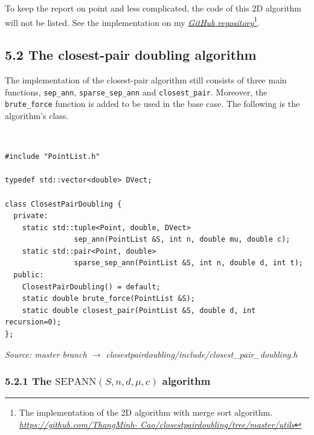 \documentclass[12pt,english,]{article}
\newcommand{\code}[1]{\colorbox{light-gray}{\texttt{#1}}}
\newcommand{\pnt}[1]{{\scriptstyle#1}}
\begin{document}
To keep the report on point and less complicated, the code of this 2D
algorithm will not be listed. See the implementation on my
\href{https://github.com/ThangMinhCao/closestpairdoubling/tree/master/utils}{\emph{GitHub
repository}}\footnote{The implementation of the 2D algorithm with merge
  sort algorithm.
  \href{https://github.com/ThangMinhCao/closestpairdoubling/tree/master/utils}{\emph{https://github.com/ThangMinh-}
  \emph{Cao/closestpairdoubling/tree/master/utils}}}.

\hypertarget{section5.2}{%
\subsection{5.2 The closest-pair doubling algorithm}\label{section5.2}}

The implementation of the closest-pair algorithm still consists of three
main functions, \code{sep\_ann}, \code{sparse\_sep\_ann} and
\code{closest\_pair}. Moreover, the \code{brute\_force} function is
added to be used in the base case. The following is the algorithm's
class.

~

\begin{lstlisting}
#include "PointList.h"

typedef std::vector<double> DVect;

class ClosestPairDoubling {
  private:
    static std::tuple<Point, double, DVect>
                sep_ann(PointList &S, int n, double mu, double c);
    static std::pair<Point, double>
                sparse_sep_ann(PointList &S, int n, double d, int t);
  public:
    ClosestPairDoubling() = default;
    static double brute_force(PointList &S);
    static double closest_pair(PointList &S, double d, int recursion=0);
};
\end{lstlisting}
\vspace{-9truemm}
\begin{minipage}{1\textwidth}
  \begin{flushright}
  {\footnotesize \emph{Source: master branch $\rightarrow$ closestpairdoubling/include/closest\_pair\_doubling.h}\par}
  \end{flushright}
\end{minipage}

\hypertarget{section5.2.1}{%
\subsubsection{\texorpdfstring{5.2.1 The
\(\mathrm{S\pnt{EP}A\pnt{NN}}(S,n,d,\mu,c)\)
algorithm}{5.2.1 The \textbackslash{}mathrm\{S\textbackslash{}pnt\{EP\}A\textbackslash{}pnt\{NN\}\}(S,n,d,\textbackslash{}mu,c) algorithm}}\label{section5.2.1}}
\end{document}
